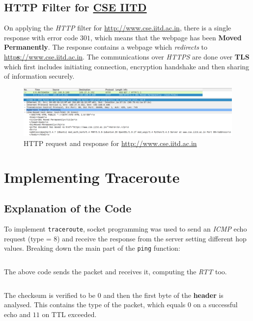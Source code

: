 \documentclass[11pt]{article}
\begin{document}
\subsection{HTTP Filter for \href{http://www.cse.iitd.ac.in}{CSE IITD}}
On applying the \textit{HTTP} filter for \url{http://www.cse.iitd.ac.in}, there is a single response with error code $301$, which means that the webpage has been \textbf{Moved Permanently}. The response contains a webpage which \textit{redirects} to \href{https://www.cse.iitd.ac.in}{http\textbf{s}://www.cse.iitd.ac.in}. The communications over \textit{HTTPS} are done over \textbf{TLS} which first includes initiating connection, encryption handshake and
then sharing of information securely.

\begin{figure}[H]
    \centering
    \includegraphics[width=1\textwidth]{cse_http}
    \caption{HTTP request and response for \url{http://www.cse.iitd.ac.in}}
\end{figure}


\section{Implementing Traceroute}

\subsection{Explanation of the Code}
To implement \texttt{traceroute}, socket programming was used to send an \textit{ICMP} echo request (type = $8$) and receive the response from the server setting different hop values. Breaking down the main part of the \texttt{ping} function:\par

\inputminted[firstline=80,lastline=83,bgcolor=mintedbg,linenos]{python}{traceroute.py}
The above code sends the packet and receives it, computing the \textit{RTT} too.\par

\inputminted[firstline=84,lastline=88,bgcolor=mintedbg,linenos]{python}{traceroute.py}
The checksum is verified to be $0$ and then the first byte of the \textbf{header} is analysed. This contains the type of the packet, which equals $0$ on a successful echo and $11$ on TTL exceeded.\par
\end{document}

